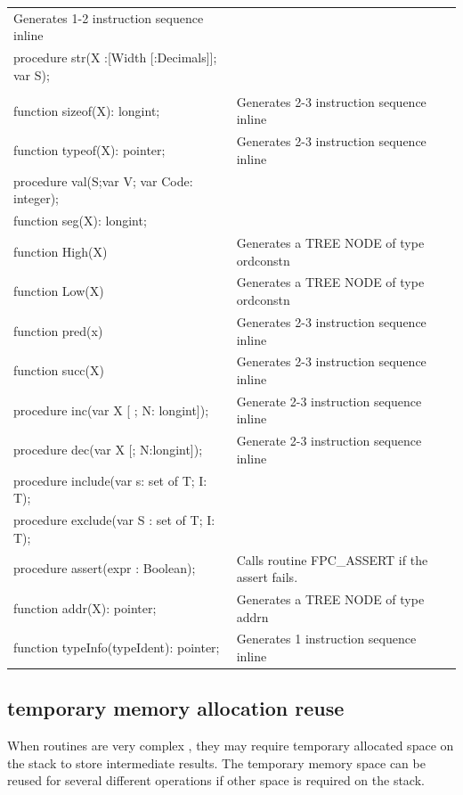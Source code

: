\documentclass [a4paper,12pt]{article}
\begin{document}
\begin{longtable}{|l|l|}
   Generates 1-2 instruction sequence inline \\
\textsf{procedure str(X :[Width [:Decimals]]; var S);}& \\
\textsf{}&  \\
\textsf{function sizeof(X): longint;}&
   Generates 2-3 instruction sequence inline \\
\textsf{function typeof(X): pointer;}&
   Generates 2-3 instruction sequence inline \\
\textsf{procedure val(S;var V; var Code: integer);}& \\
\textsf{function seg(X): longint;}& \\
\textsf{function High(X)}&
   Generates a TREE NODE of type ordconstn \\
\textsf{function Low(X)}&
   Generates a TREE NODE of type ordconstn \\
\textsf{function pred(x)}&
   Generates 2-3 instruction sequence inline \\
\textsf{function succ(X)}&
   Generates 2-3 instruction sequence inline \\
\textsf{procedure inc(var X [ ; N: longint]);}&
   Generate 2-3 instruction sequence inline \\
\textsf{procedure dec(var X [; N:longint]);}&
   Generate 2-3 instruction sequence inline \\
\textsf{procedure include(var s: set of T; I: T);}& \\
\textsf{procedure exclude(var S : set of T; I: T);}& \\
\textsf{procedure assert(expr : Boolean);}&
  Calls routine FPC{\_}ASSERT if the assert fails.\\
\textsf{function addr(X): pointer;}&
  Generates a TREE NODE of type addrn \\
\textsf{function typeInfo(typeIdent): pointer;}&
  Generates 1 instruction sequence inline \\
\end{longtable}

\subsection{temporary memory allocation reuse}
\label{subsec:mylabel11}

When routines are very complex , they may require temporary allocated space
on the stack to store intermediate results. The temporary memory space can
be reused for several different operations if other space is required on the
stack.
\end{document}
